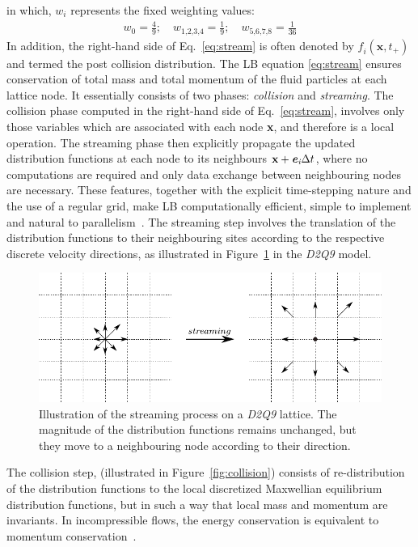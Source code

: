 in which, $\textit{w}_{\textit{i}}$ represents the fixed weighting values:
\begin{align}
\textit{w}_{\textit{0}} = \frac{4}{9}; \quad \textit{w}_{\textit{1,2,3,4}}= \frac{1}{9}; \quad \textit{w}_{\textit{5,6,7,8}}= \frac{1}{36}
\end{align}
In addition, the right-hand side of Eq.~\ref{eq:stream} is often denoted by $\textit{f}_{\textit{i}}(\textbf{x}, \textit{t}_{+})$ and termed the post collision distribution. The LB equation \ref{eq:stream} ensures conservation of total mass and total momentum of the fluid particles at each lattice node. It essentially consists of two phases: \textit{collision} and \textit{streaming}. The collision phase computed in the right-hand side of Eq.~\ref{eq:stream}, involves only those variables which are associated with each node \textbf{x}, and therefore is a local operation. The streaming phase then explicitly propagate the updated distribution functions at each node to its neighbours $\textbf{x}+\textbf{\textit{e}}_{\textit{i}} \Delta t$, where no computations are required and only data exchange between neighbouring nodes are necessary. These features, together with the explicit time-stepping nature and the use of a regular grid, make LB computationally efficient, simple to implement and natural to parallelism~\citep{han2007}. The streaming step involves the translation of the distribution functions to their neighbouring sites according to the respective discrete velocity directions, as illustrated in Figure~\ref{fig:stream} in the \textit{D2Q9} model. 
\clearpage
\begin{figure}[htbp]
\centering
\includegraphics{Chapter3/figures/lbm/stream.pdf}
\caption[Illustration of the streaming process on a \textit{D2Q9} lattice]{Illustration of the streaming process on a \textit{D2Q9} lattice. The magnitude of the distribution functions remains unchanged, but they move to a neighbouring node according to their direction.}
\label{fig:stream}
\end{figure}
The collision step, (illustrated in Figure~\ref{fig:collision}) consists of re-distribution of the distribution functions to the local discretized Maxwellian equilibrium distribution functions, but in such a way that local mass and momentum are invariants. In incompressible flows, the energy conservation is equivalent to momentum conservation~\citep{he1997}.

